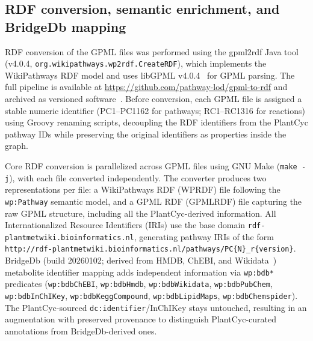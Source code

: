 \documentclass[11pt,a4paper]{article}
\begin{document}
\subsection*{RDF conversion, semantic enrichment, and BridgeDb mapping}
RDF conversion of the GPML files was performed using the gpml2rdf Java tool (v4.0.4,
\texttt{org.\allowbreak{}wikipathways.\allowbreak{}wp2rdf.\allowbreak{}CreateRDF}), which implements the WikiPathways RDF model and uses
libGPML v4.0.4~\cite{pico2025} for GPML parsing. The full pipeline is available at
\url{https://github.com/pathway-lod/gpml-to-rdf} and archived as versioned
software~\cite{delpup2026gpml2rdf}. Before conversion, each GPML file is assigned a
stable numeric identifier (PC1--PC1162 for pathways; RC1--RC1316 for reactions) using Groovy renaming
scripts, decoupling the RDF identifiers from the PlantCyc pathway IDs while preserving the original
identifiers as properties inside the graph.

Core RDF conversion is parallelized across GPML files using GNU Make (\texttt{make -j}), with each
file converted independently. The converter produces two representations per file: a WikiPathways RDF
(WPRDF) file following the \texttt{wp:Pathway} semantic model, and a GPML RDF (GPMLRDF) file capturing
the raw GPML structure, including all the PlantCyc-derived information. All Internationalized Resource
Identifiers (IRIs) use the base domain \texttt{rdf-\allowbreak{}plantmetwiki.\allowbreak{}bioinformatics.\allowbreak{}nl}, generating pathway
IRIs of the form \texttt{http://\allowbreak{}rdf-\allowbreak{}plantmetwiki.\allowbreak{}bioinformatics.\allowbreak{}nl/\allowbreak{}pathways/\allowbreak{}PC\{N\}\_\allowbreak{}r\{version\}}.
BridgeDb (build 20260102; derived from HMDB, ChEBI, and Wikidata~\cite{bridgedb2026db}) metabolite
identifier mapping adds
independent information via \texttt{wp:bdb*} predicates (\texttt{wp:\allowbreak{}bdbChEBI}, \texttt{wp:\allowbreak{}bdbHmdb},
\texttt{wp:\allowbreak{}bdbWikidata}, \texttt{wp:\allowbreak{}bdbPubChem}, \texttt{wp:\allowbreak{}bdbInChIKey},
\texttt{wp:\allowbreak{}bdbKeggCompound}, \texttt{wp:\allowbreak{}bdbLipidMaps}, \texttt{wp:\allowbreak{}bdbChemspider}). The
PlantCyc-sourced \texttt{dc:identifier}/InChIKey stays untouched, resulting in an augmentation with
preserved provenance to distinguish PlantCyc-curated annotations from BridgeDb-derived ones.
\end{document}
